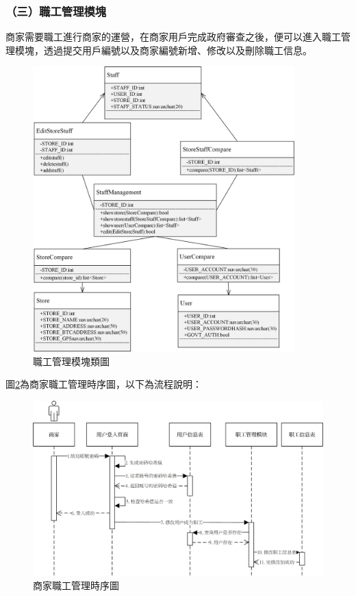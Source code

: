 \subsubsection{（三）職工管理模塊}
商家需要職工進行商家的運營，在商家用戶完成政府審查之後，便可以進入職工管理模塊，透過提交用戶編號以及商家編號新增、修改以及刪除職工信息。

	\begin{figure}[htbp]
		\centering
		\includegraphics[width = 0.9\textwidth]{c1.jpg}
		\caption{職工管理模塊類圖}\label{c1}
	\end{figure}

	

	圖\ref{time2}為商家職工管理時序圖，以下為流程說明：

	\begin{figure}[htbp]
		\centering
		\includegraphics[width = 1\textwidth]{time2.jpg}
		\caption{商家職工管理時序圖}\label{time2}
	\end{figure}

